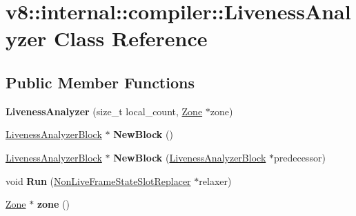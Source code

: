 \hypertarget{classv8_1_1internal_1_1compiler_1_1_liveness_analyzer}{}\section{v8\+:\+:internal\+:\+:compiler\+:\+:Liveness\+Analyzer Class Reference}
\label{classv8_1_1internal_1_1compiler_1_1_liveness_analyzer}
\subsection*{Public Member Functions}
\begin{DoxyCompactItemize}
\item 
{\bfseries Liveness\+Analyzer} (size\+\_\+t local\+\_\+count, \hyperlink{classv8_1_1internal_1_1_zone}{Zone} $\ast$zone)\hypertarget{classv8_1_1internal_1_1compiler_1_1_liveness_analyzer_a7ac0ab951ca36055b4921df31563b62a}{}\label{classv8_1_1internal_1_1compiler_1_1_liveness_analyzer_a7ac0ab951ca36055b4921df31563b62a}

\item 
\hyperlink{classv8_1_1internal_1_1compiler_1_1_liveness_analyzer_block}{Liveness\+Analyzer\+Block} $\ast$ {\bfseries New\+Block} ()\hypertarget{classv8_1_1internal_1_1compiler_1_1_liveness_analyzer_aa8594810ca9eb00fdca5f2a399f821fc}{}\label{classv8_1_1internal_1_1compiler_1_1_liveness_analyzer_aa8594810ca9eb00fdca5f2a399f821fc}

\item 
\hyperlink{classv8_1_1internal_1_1compiler_1_1_liveness_analyzer_block}{Liveness\+Analyzer\+Block} $\ast$ {\bfseries New\+Block} (\hyperlink{classv8_1_1internal_1_1compiler_1_1_liveness_analyzer_block}{Liveness\+Analyzer\+Block} $\ast$predecessor)\hypertarget{classv8_1_1internal_1_1compiler_1_1_liveness_analyzer_a385ca2a320ec6e6d14d2da9cfe7eef9f}{}\label{classv8_1_1internal_1_1compiler_1_1_liveness_analyzer_a385ca2a320ec6e6d14d2da9cfe7eef9f}

\item 
void {\bfseries Run} (\hyperlink{classv8_1_1internal_1_1compiler_1_1_non_live_frame_state_slot_replacer}{Non\+Live\+Frame\+State\+Slot\+Replacer} $\ast$relaxer)\hypertarget{classv8_1_1internal_1_1compiler_1_1_liveness_analyzer_a40b6a56e9d7b2340a03c6e5bb83c258d}{}\label{classv8_1_1internal_1_1compiler_1_1_liveness_analyzer_a40b6a56e9d7b2340a03c6e5bb83c258d}

\item 
\hyperlink{classv8_1_1internal_1_1_zone}{Zone} $\ast$ {\bfseries zone} ()\hypertarget{classv8_1_1internal_1_1compiler_1_1_liveness_analyzer_a4ec6359818a526ccb702ed4ca1a02f3a}{}\label{classv8_1_1internal_1_1compiler_1_1_liveness_analyzer_a4ec6359818a526ccb702ed4ca1a02f3a}


\end{DoxyCompactItemize}
